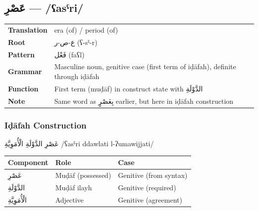 \documentclass[letterpaper,12pt]{article}
\begin{document}
\subsection{\textarabic{عَصْرِ} — /ʕasˤri/}
\begin{tabular}{p{3cm}p{10cm}}
\toprule
\textbf{Translation} & era (of) / period (of) \\
\textbf{Root} & \textarabic{ع-ص-ر} (ʕ-sˤ-r) \\
\textbf{Pattern} & \textarabic{فَعْل} (faʕl) \\
\textbf{Grammar} & Masculine noun, genitive case (first term of iḍāfah), definite through iḍāfah \\
\midrule
\textbf{Function} & First term (muḍāf) in construct state with \textarabic{الدَّوْلَةِ} \\
\textbf{Note} & Same word as \textarabic{بِعَصْرٍ} earlier, but here in iḍāfah construction \\
\bottomrule
\end{tabular}

\subsubsection*{Iḍāfah Construction}
\textarabic{عَصْرِ الدَّوْلَةِ الْأُمَوِيَّةِ} /ʕasˤri ddawlati l-ʔumawijjati/

\begin{tabular}{|l|l|l|}
\hline
\textbf{Component} & \textbf{Role} & \textbf{Case} \\
\hline
\textarabic{عَصْرِ} & Muḍāf (possessed) & Genitive (from syntax) \\
\hline
\textarabic{الدَّوْلَةِ} & Muḍāf ilayh & Genitive (required) \\
\hline
\textarabic{الْأُمَوِيَّةِ} & Adjective & Genitive (agreement) \\
\hline
\end{tabular}
\end{document}
